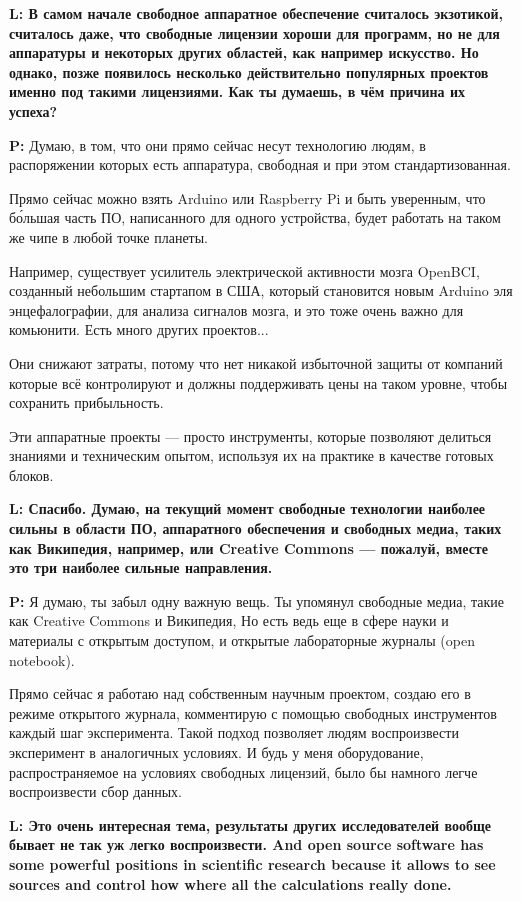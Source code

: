 \documentclass[10pt, a5paper]{article}
\begin{document}
\begin{Parallel}[p]{}{}
{{\noindent \bf L: В самом начале свободное аппаратное обеспечение считалось экзотикой, считалось даже, что свободные лицензии хороши для программ, но не для аппаратуры и некоторых других областей, как например искусство. Но однако, позже появилось несколько действительно популярных проектов именно под такими лицензиями. Как ты думаешь, в чём причина их успеха?}

{\noindent \bf P:} Думаю, в том, что они прямо сейчас несут технологию людям, в распоряжении которых есть аппаратура, свободная и при этом стандартизованная.

Прямо сейчас можно взять Arduino или Raspberry Pi и быть уверенным, что б\'{о}льшая часть ПО, написанного для одного устройства, будет работать на таком же чипе в любой точке планеты. 

Например, существует усилитель электрической активности мозга OpenBCI, созданный небольшим стартапом в США, который становится новым Arduino эля энцефалографии, для анализа сигналов мозга, и это тоже очень важно для комьюнити. Есть много других проектов...

Они снижают затраты, потому что нет никакой избыточной защиты от компаний которые всё контролируют и должны поддерживать цены на таком уровне, чтобы сохранить прибыльность. 

Эти аппаратные проекты --- просто инструменты, которые позволяют делиться знаниями и техническим опытом, используя их на практике в качестве готовых блоков.

{\noindent \bf L: Спасибо. 
Думаю, на текущий момент свободные технологии наиболее сильны в области ПО, аппаратного обеспечения и свободных медиа, таких как Википедия, например, или Creative Commons --- пожалуй, вместе это три наиболее сильные направления.}

{\noindent \bf P:} Я думаю, ты забыл одну важную вещь. Ты упомянул свободные медиа, такие как Creative Commons и Википедия, Но есть ведь еще в сфере науки и материалы с открытым доступом, и открытые лабораторные журналы (open notebook). 

Прямо сейчас я работаю над собственным научным проектом, создаю его в режиме открытого журнала, комментирую с помощью свободных инструментов каждый шаг эксперимента. Такой подход позволяет людям воспроизвести эксперимент в аналогичных условиях. И будь у меня оборудование, распространяемое на условиях свободных лицензий, было бы намного легче воспроизвести сбор данных.

{\noindent \bf L: Это очень интересная тема, результаты других исследователей вообще бывает не так уж легко воспроизвести.
And open source software has some powerful positions in scientific research because it allows to see sources and control how where all the calculations really done. }

}
\end{Parallel}
\end{document}
